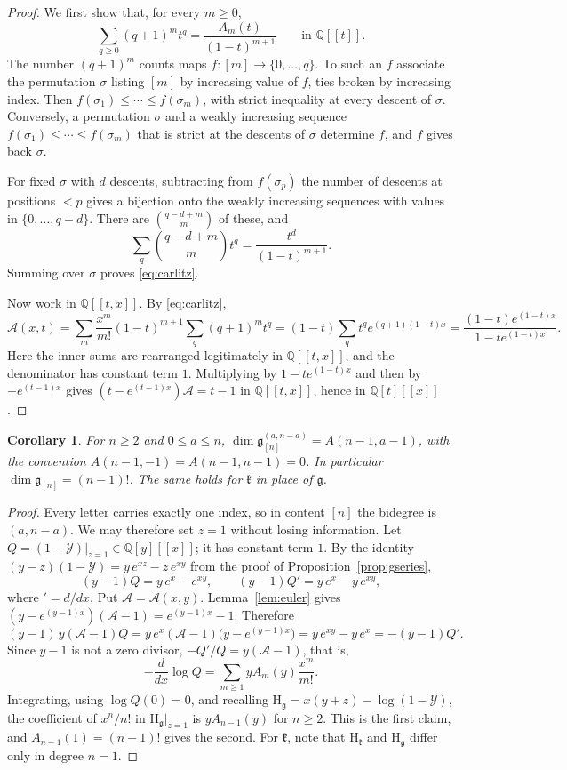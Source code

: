 \documentclass[11pt]{amsart}
\newtheorem{corollary}[theorem]{Corollary}
\theoremstyle{definition}
\theoremstyle{remark}
\newcommand{\Q}{\mathbb{Q}}
\newcommand{\g}{\mathfrak{g}}
\newcommand{\kr}{\mathfrak{k}}
\newcommand{\Hs}{\mathrm{H}}
\begin{document}
\begin{proof}
We first show that, for every $m\ge0$,
\begin{equation}\label{eq:carlitz}
\sum_{q\ge0}(q+1)^mt^q=\frac{A_m(t)}{(1-t)^{m+1}}\qquad\text{in }\Q[[t]].
\end{equation}
The number $(q+1)^m$ counts maps $f\colon[m]\to\{0,\dots,q\}$. To such an $f$ associate the permutation $\sigma$ listing $[m]$ by increasing value of $f$, ties broken by increasing index. Then $f(\sigma_1)\le\cdots\le f(\sigma_m)$, with strict inequality at every descent of $\sigma$. Conversely, a permutation $\sigma$ and a weakly increasing sequence $f(\sigma_1)\le\cdots\le f(\sigma_m)$ that is strict at the descents of $\sigma$ determine $f$, and $f$ gives back $\sigma$.

For fixed $\sigma$ with $d$ descents, subtracting from $f(\sigma_p)$ the number of descents at positions $<p$ gives a bijection onto the weakly increasing sequences with values in $\{0,\dots,q-d\}$. There are $\binom{q-d+m}{m}$ of these, and
\[
\sum_q\binom{q-d+m}{m}t^q=\frac{t^d}{(1-t)^{m+1}}.
\]
Summing over $\sigma$ proves \eqref{eq:carlitz}.

Now work in $\Q[[t,x]]$. By \eqref{eq:carlitz},
\[
\mathcal A(x,t)=\sum_m\frac{x^m}{m!}(1-t)^{m+1}\sum_q(q+1)^mt^q=(1-t)\sum_qt^qe^{(q+1)(1-t)x}=\frac{(1-t)e^{(1-t)x}}{1-te^{(1-t)x}}.
\]
Here the inner sums are rearranged legitimately in $\Q[[t,x]]$, and the denominator has constant term $1$. Multiplying by $1-te^{(1-t)x}$ and then by $-e^{(t-1)x}$ gives $(t-e^{(t-1)x})\mathcal A=t-1$ in $\Q[[t,x]]$, hence in $\Q[t][[x]]$.
\end{proof}

\begin{corollary}\label{cor:eulerian}
For $n\ge2$ and $0\le a\le n$, $\dim\g_{[n]}^{(a,n-a)}=A(n-1,a-1)$, with the convention $A(n-1,-1)=A(n-1,n-1)=0$. In particular $\dim\g_{[n]}=(n-1)!$. The same holds for $\kr$ in place of $\g$.
\end{corollary}

\begin{proof}
Every letter carries exactly one index, so in content $[n]$ the bidegree is $(a,n-a)$. We may therefore set $z=1$ without losing information. Let $Q=(1-\mathcal Y)|_{z=1}\in\Q[y][[x]]$; it has constant term $1$. By the identity $(y-z)(1-\mathcal Y)=y\,e^{xz}-z\,e^{xy}$ from the proof of Proposition~\ref{prop:gseries},
\[
(y-1)Q=y\,e^{x}-e^{xy},\qquad (y-1)Q'=y\,e^{x}-y\,e^{xy},
\]
where $'=d/dx$. Put $\mathcal A=\mathcal A(x,y)$. Lemma~\ref{lem:euler} gives $(y-e^{(y-1)x})(\mathcal A-1)=e^{(y-1)x}-1$. Therefore
\[
(y-1)\,y(\mathcal A-1)Q=y\,e^x(\mathcal A-1)\big(y-e^{(y-1)x}\big)=y\,e^{xy}-y\,e^x=-(y-1)Q'.
\]
Since $y-1$ is not a zero divisor, $-Q'/Q=y(\mathcal A-1)$, that is,
\[
-\frac{d}{dx}\log Q=\sum_{m\ge1}yA_m(y)\frac{x^m}{m!}.
\]
Integrating, using $\log Q(0)=0$, and recalling $\Hs_\g=x(y+z)-\log(1-\mathcal Y)$, the coefficient of $x^n/n!$ in $\Hs_\g|_{z=1}$ is $yA_{n-1}(y)$ for $n\ge2$. This is the first claim, and $A_{n-1}(1)=(n-1)!$ gives the second. For $\kr$, note that $\Hs_\kr$ and $\Hs_\g$ differ only in degree $n=1$.
\end{proof}
\end{document}
